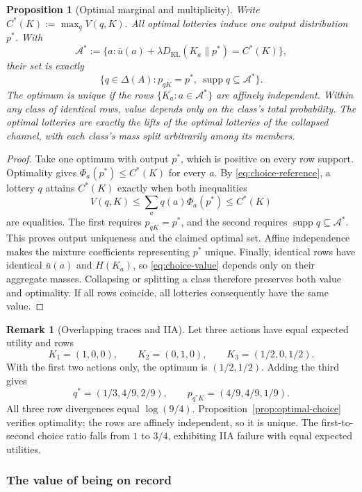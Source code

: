 \documentclass[11pt,a4paper]{article}
\newtheorem{proposition}[theorem]{Proposition}
\theoremstyle{definition}
\newtheorem{remark}[theorem]{Remark}
\newcommand{\D}{\Delta}
\newcommand{\Sh}{H}
\newcommand{\supp}{\operatorname{supp}}
\newcommand{\KL}{D_{\mathrm{KL}}}
\newcommand{\1}{\mathbf 1}
\begin{document}
\begin{proposition}[Optimal marginal and multiplicity]\label{prop:optimal-marginal}
Write $C^*(K):=\max_qV(q,K)$.  All optimal lotteries induce one output
distribution $p^*$.  With
\[
\mathcal A^*:=\{a:\bar u(a)+\lambda\KL(K_a\|p^*)=C^*(K)\},
\]
their set is exactly
\[
\{q\in\D(A):p_{qK}=p^*,\ \supp q\subseteq\mathcal A^*\}.
\]
The optimum is unique if the rows $\{K_a:a\in\mathcal A^*\}$ are affinely
independent.  Within any class of identical rows, value depends only on
the class's total probability.  The optimal lotteries are exactly the
lifts of the optimal lotteries of the collapsed channel, with each class's
mass split arbitrarily among its members.
\end{proposition}

\begin{proof}
Take one optimum with output $p^*$, which is positive on every row support.
Optimality gives $\Phi_a(p^*)\le C^*(K)$ for every $a$.  By
\eqref{eq:choice-reference}, a lottery $q$ attains $C^*(K)$ exactly when
both inequalities
\[
V(q,K)\le\sum_aq(a)\Phi_a(p^*)\le C^*(K)
\]
are equalities.  The first requires $p_{qK}=p^*$, and the second requires
$\supp q\subseteq\mathcal A^*$.  This proves output uniqueness and the
claimed optimal set.  Affine independence makes the mixture coefficients
representing $p^*$ unique.  Finally, identical rows have identical
$\bar u(a)$ and $\Sh(K_a)$, so \eqref{eq:choice-value} depends only on
their aggregate masses.  Collapsing or splitting a class therefore
preserves both value and optimality.
If all rows coincide, all lotteries consequently have the same value.
\end{proof}

\begin{remark}[Overlapping traces and IIA]\label{rem:overlap-iia-example}
Let three actions have equal expected utility and rows
\[
K_1=(1,0,0),\qquad K_2=(0,1,0),\qquad K_3=(1/2,0,1/2).
\]
With the first two actions only, the optimum is $(1/2,1/2)$.  Adding the
third gives
\[
q^*=(1/3,4/9,2/9),\qquad p_{q^*K}=(4/9,4/9,1/9).
\]
All three row divergences equal $\log(9/4)$.
Proposition~\ref{prop:optimal-choice} verifies optimality; the rows are
affinely independent, so it is unique.  The first-to-second choice ratio
falls from $1$ to $3/4$, exhibiting IIA failure with equal expected utilities.
\end{remark}

\subsubsection{The value of being on record}
\label{app:record-value-proofs}
\end{document}
